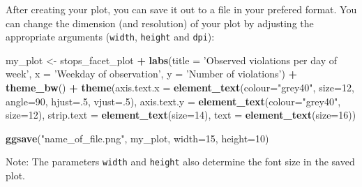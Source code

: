 \documentclass[]{book}
\newenvironment{Shaded}{\begin{snugshade}}{\end{snugshade}}
\newcommand{\KeywordTok}[1]{\textcolor[rgb]{0.13,0.29,0.53}{\textbf{#1}}}
\newcommand{\DataTypeTok}[1]{\textcolor[rgb]{0.13,0.29,0.53}{#1}}
\newcommand{\DecValTok}[1]{\textcolor[rgb]{0.00,0.00,0.81}{#1}}
\newcommand{\StringTok}[1]{\textcolor[rgb]{0.31,0.60,0.02}{#1}}
\newcommand{\OperatorTok}[1]{\textcolor[rgb]{0.81,0.36,0.00}{\textbf{#1}}}
\newcommand{\NormalTok}[1]{#1}
\theoremstyle{definition}
\theoremstyle{definition}
\theoremstyle{definition}
\theoremstyle{remark}
\begin{document}
After creating your plot, you can save it out to a file in your prefered
format. You can change the dimension (and resolution) of your plot by
adjusting the appropriate arguments (\texttt{width}, \texttt{height} and
\texttt{dpi}):

\begin{Shaded}
\begin{Highlighting}[]
\NormalTok{my_plot <-}\StringTok{ }\NormalTok{stops_facet_plot }\OperatorTok{+}
\StringTok{  }\KeywordTok{labs}\NormalTok{(}\DataTypeTok{title =} \StringTok{'Observed violations per day of week'}\NormalTok{,}
         \DataTypeTok{x =} \StringTok{'Weekday of observation'}\NormalTok{,}
         \DataTypeTok{y =} \StringTok{'Number of violations'}\NormalTok{) }\OperatorTok{+}
\StringTok{  }\KeywordTok{theme_bw}\NormalTok{() }\OperatorTok{+}\StringTok{ }
\StringTok{  }\KeywordTok{theme}\NormalTok{(}\DataTypeTok{axis.text.x =} \KeywordTok{element_text}\NormalTok{(}\DataTypeTok{colour=}\StringTok{"grey40"}\NormalTok{, }\DataTypeTok{size=}\DecValTok{12}\NormalTok{, }\DataTypeTok{angle=}\DecValTok{90}\NormalTok{, }\DataTypeTok{hjust=}\NormalTok{.}\DecValTok{5}\NormalTok{, }\DataTypeTok{vjust=}\NormalTok{.}\DecValTok{5}\NormalTok{),}
        \DataTypeTok{axis.text.y =} \KeywordTok{element_text}\NormalTok{(}\DataTypeTok{colour=}\StringTok{"grey40"}\NormalTok{, }\DataTypeTok{size=}\DecValTok{12}\NormalTok{),}
        \DataTypeTok{strip.text =} \KeywordTok{element_text}\NormalTok{(}\DataTypeTok{size=}\DecValTok{14}\NormalTok{),}
        \DataTypeTok{text =} \KeywordTok{element_text}\NormalTok{(}\DataTypeTok{size=}\DecValTok{16}\NormalTok{))}

\KeywordTok{ggsave}\NormalTok{(}\StringTok{"name_of_file.png"}\NormalTok{, my_plot, }\DataTypeTok{width=}\DecValTok{15}\NormalTok{, }\DataTypeTok{height=}\DecValTok{10}\NormalTok{)}
\end{Highlighting}
\end{Shaded}

Note: The parameters \texttt{width} and \texttt{height} also determine
the font size in the saved plot.


\end{document}
